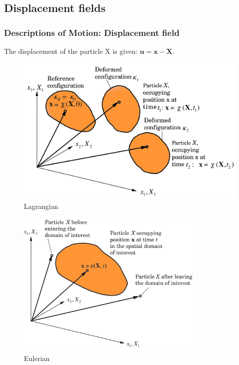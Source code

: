 \documentclass[notes]{beamer}
\begin{document}
\subsection{Displacement fields}
\begin{frame}
	\frametitle{Descriptions of Motion: Displacement field}
	The displacement of the particle X is given: $\mathbf{u = x -X}$.
	\noindent
	\fboxsep=0pt
	\noindent
	\begin{minipage}[t]{0.49\linewidth}
		\begin{figure}
			\includegraphics[width=\textwidth]{figs/lagrangian.png}
			\caption*{Lagrangian}
		\end{figure}
	\end{minipage}%
	\hfill%
	\begin{minipage}[t]{0.49\linewidth}
		\begin{figure}
			\includegraphics[width=0.8\textwidth]{figs/eulerian.png}
			\caption*{Eulerian}
		\end{figure}
	\end{minipage}	
\end{frame}
\end{document}
